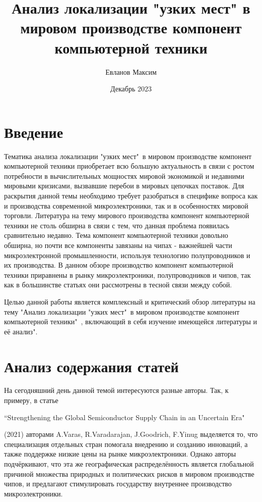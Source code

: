 \documentclass[14pt, a4paper]{extarticle}
\title{Анализ локализации "узких мест" в мировом производстве компонент компьютерной техники}
\author{Евланов Максим}
\date{Декабрь 2023}
\begin{document}
\maketitle
\newpage 

\tableofcontents{\vspace{3cm}}
\newpage 


\section{Введение}

Тематика анализа локализации "узких мест"\ в мировом производстве компонент компьютерной техники приобретает всю большую актуальность в связи с ростом потребности в вычислительных мощностях мировой экономикой и недавними мировыми кризисами, вызвавшие перебои в мировых цепочках поставок. Для раскрытия данной темы необходимо требует разобраться в специфике вопроса как и производства современной микроэлектроники, так и в особенностях мировой торговли. Литература на тему мирового производства компонент компьютерной техники не столь обширна в связи с тем, что данная проблема появилась сравнительно недавно. Тема компонент компьютерной техники довольно обширна, но почти все компоненты завязаны на чипах - важнейшей части микроэлектронной промышленности, используя технологию полупроводников и их производства. В данном обзоре производство компонент компьютерной техники приравнены в рынку микроэлектроники, полупроводников и чипов, так как в большинстве статьях они рассмотрены в тесной связи между собой.

Целью данной работы является комплексный и критический обзор литературы на тему "Анализ локализации "узких мест"\ в мировом производстве компонент компьютерной техники"\ , включающий в себя изучение имеющейся литературы и её анализ". 

\newpage 
\section{Анализ содержания статей}

На сегодняшний день данной темой интересуются разные авторы. Так, к примеру, в статье \begin{english} ``Strengthening the Global Semiconductor Supply Chain in an Uncertain Era"\end{english} (2021) авторами A.Varas, R.Varadarajan, J.Goodrich, F.Yinug выделяется то, что специализация отдельных стран помогала внедрению и созданию инноваций, а также поддержке низкие цены на рынке микроэлектроники. Однако авторы подчёркивают, что эта же географическая распределённость является глобальной причиной множества природных и политических рисков в мировом производстве чипов, и предлагают стимулировать государству внутреннее производство микроэлектроники.
\end{document}
